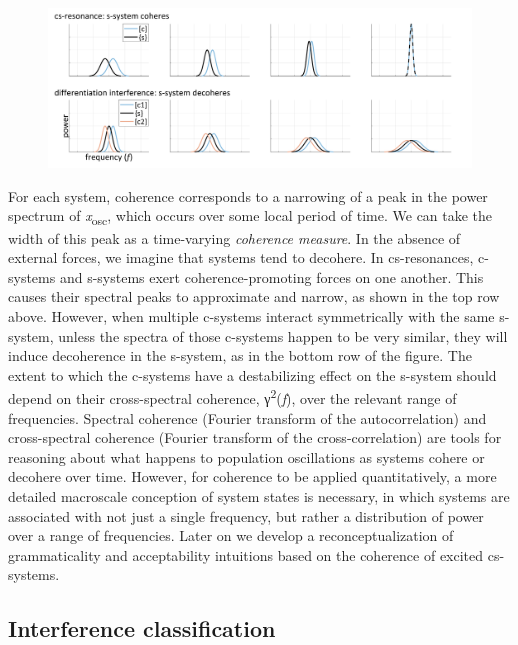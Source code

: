   
\begin{figure}
\includegraphics[width=\textwidth]{figures/Tilsen-img93.png}
\caption{\missingcaption}
\label{fig:4:43}
\end{figure}
 

  For each system, coherence corresponds to a narrowing of a peak in the power spectrum of \textit{x}\textsubscript{osc}, which occurs over some local period of time. We can take the width of this peak as a time-varying \textit{coherence measure}. In the absence of external forces, we imagine that systems tend to decohere. In cs-resonances, c-systems and s-systems exert coherence-promoting forces on one another. This causes their spectral peaks to approximate and narrow, as shown in the top row above. However, when multiple c-systems interact symmetrically with the same s-system, unless the spectra of those c-systems happen to be very similar, they will induce decoherence in the s-system, as in the bottom row of the figure. The extent to which the c-systems have a destabilizing effect on the s-system should depend on their cross-spectral coherence, γ\textsuperscript{2}(\textit{f}), over the relevant range of frequencies. Spectral coherence (Fourier transform of the autocorrelation) and cross-spectral coherence (Fourier transform of the cross-correlation) are tools for reasoning about what happens to population oscillations as systems cohere or decohere over time. However, for coherence to be applied quantitatively, a more detailed macroscale conception of system states is necessary, in which systems are associated with not just a single frequency, but rather a distribution of power over a range of frequencies. Later on we develop a reconceptualization of grammaticality and acceptability intuitions based on the coherence of excited cs-systems.

\subsection{Interference classification}

